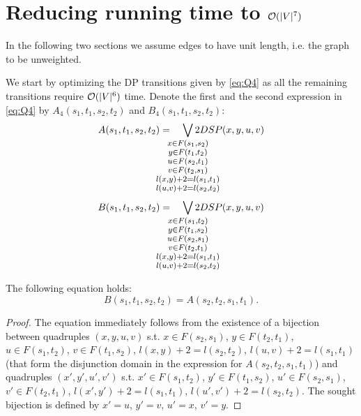 \section{Reducing running time to $\mathcal{O}(|V|^7)$}

In the following two sections we assume edges to have unit length, i.e. the graph to be unweighted.

We start by optimizing the DP transitions given by \eqref{eq:Q4} as all the remaining transitions require $\mathcal{O}(|V|^6)$ time. Denote the first and the second expression in \eqref{eq:Q4} by $A_4(s_1, t_1, s_2, t_2)$ and $B_4(s_1, t_1, s_2, t_2)$:
\begin{align} \label{eq:A}
    A(s_1, t_1, s_2, t_2) = \quad
        \smashoperator{\bigvee_{
        \large \substack{
            x \in F(s_1, s_2)\\ 
            y \in F(t_1, t_2)\\ 
            u \in F(s_2, t_1)\\ 
            v \in F(t_2, s_1)\\ 
            l(x, y) + 2 = l(s_1, t_1)\\ 
            l(u, v) + 2 = l(s_2, t_2)
        }
        }} 2DSP(x, y, u, v) \\
\end{align}
\begin{align} \label{eq:B}
   B(s_1, t_1, s_2, t_2) = \quad
        \smashoperator{\bigvee_{
        \large \substack{
            x \in F(s_1, t_2)\\ 
            y \in F(t_1, s_2)\\ 
            u \in F(s_2, s_1)\\ 
            v \in F(t_2, t_1)\\ 
            l(x, y) + 2 = l(s_1, t_1)\\ 
            l(u, v) + 2 = l(s_2, t_2)
        }
        }} 2DSP(x, y, u, v) \\
\end{align}
\begin{proposition}
The following equation holds:
\begin{equation}
    B(s_1, t_1, s_2, t_2) = A(s_2, t_2, s_1, t_1).
\end{equation}
\end{proposition}
\begin{proof}
The equation immediately follows from the existence of a bijection between quadruples $(x, y, u, v)$ s.t. $x \in F(s_2, s_1)$, $y \in F(t_2, t_1)$, $u \in F(s_1, t_2)$, $v \in F(t_1, s_2)$, $l(x, y) + 2 = l(s_2, t_2)$, $l(u, v) + 2 = l(s_1, t_1)$ (that form the disjunction domain in the expression for $A(s_2, t_2, s_1, t_1)$) and quadruples $(x', y', u', v')$ s.t. $x' \in F(s_1, t_2)$, $y' \in F(t_1, s_2)$, $u' \in F(s_2, s_1)$, $v' \in F(t_2, t_1)$, $l(x', y') + 2 = l(s_1, t_1)$, $l(u', v') + 2 = l(s_2, t_2)$. The sought bijection is defined by $x' = u$, $y' = v$, $u' = x$, $v' = y$.
\end{proof}

